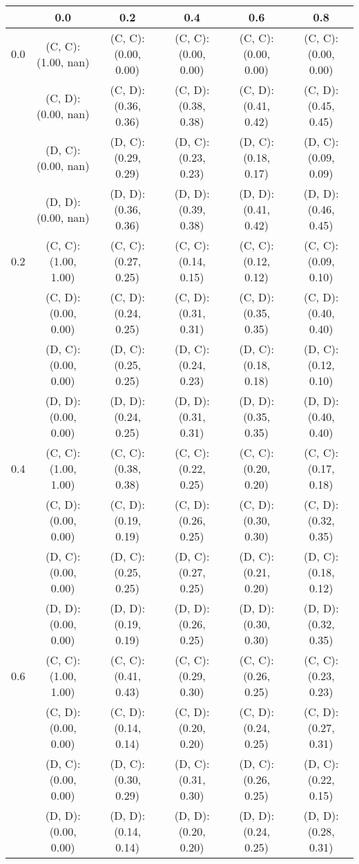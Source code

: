 \begin{tabular}{c | c c c c c}
& 0.0 & 0.2 & 0.4 & 0.6 & 0.8 \\
\hline
0.0 & (C, C): (1.00, nan) & (C, C): (0.00, 0.00) & (C, C): (0.00, 0.00) & (C, C): (0.00, 0.00) & (C, C): (0.00, 0.00) \\
 & (C, D): (0.00, nan) & (C, D): (0.36, 0.36) & (C, D): (0.38, 0.38) & (C, D): (0.41, 0.42) & (C, D): (0.45, 0.45) \\
 & (D, C): (0.00, nan) & (D, C): (0.29, 0.29) & (D, C): (0.23, 0.23) & (D, C): (0.18, 0.17) & (D, C): (0.09, 0.09) \\
 & (D, D): (0.00, nan) & (D, D): (0.36, 0.36) & (D, D): (0.39, 0.38) & (D, D): (0.41, 0.42) & (D, D): (0.46, 0.45) \\
\hline
0.2 & (C, C): (1.00, 1.00) & (C, C): (0.27, 0.25) & (C, C): (0.14, 0.15) & (C, C): (0.12, 0.12) & (C, C): (0.09, 0.10) \\
 & (C, D): (0.00, 0.00) & (C, D): (0.24, 0.25) & (C, D): (0.31, 0.31) & (C, D): (0.35, 0.35) & (C, D): (0.40, 0.40) \\
 & (D, C): (0.00, 0.00) & (D, C): (0.25, 0.25) & (D, C): (0.24, 0.23) & (D, C): (0.18, 0.18) & (D, C): (0.12, 0.10) \\
 & (D, D): (0.00, 0.00) & (D, D): (0.24, 0.25) & (D, D): (0.31, 0.31) & (D, D): (0.35, 0.35) & (D, D): (0.40, 0.40) \\
\hline
0.4 & (C, C): (1.00, 1.00) & (C, C): (0.38, 0.38) & (C, C): (0.22, 0.25) & (C, C): (0.20, 0.20) & (C, C): (0.17, 0.18) \\
 & (C, D): (0.00, 0.00) & (C, D): (0.19, 0.19) & (C, D): (0.26, 0.25) & (C, D): (0.30, 0.30) & (C, D): (0.32, 0.35) \\
 & (D, C): (0.00, 0.00) & (D, C): (0.25, 0.25) & (D, C): (0.27, 0.25) & (D, C): (0.21, 0.20) & (D, C): (0.18, 0.12) \\
 & (D, D): (0.00, 0.00) & (D, D): (0.19, 0.19) & (D, D): (0.26, 0.25) & (D, D): (0.30, 0.30) & (D, D): (0.32, 0.35) \\
\hline
0.6 & (C, C): (1.00, 1.00) & (C, C): (0.41, 0.43) & (C, C): (0.29, 0.30) & (C, C): (0.26, 0.25) & (C, C): (0.23, 0.23) \\
 & (C, D): (0.00, 0.00) & (C, D): (0.14, 0.14) & (C, D): (0.20, 0.20) & (C, D): (0.24, 0.25) & (C, D): (0.27, 0.31) \\
 & (D, C): (0.00, 0.00) & (D, C): (0.30, 0.29) & (D, C): (0.31, 0.30) & (D, C): (0.26, 0.25) & (D, C): (0.22, 0.15) \\
 & (D, D): (0.00, 0.00) & (D, D): (0.14, 0.14) & (D, D): (0.20, 0.20) & (D, D): (0.24, 0.25) & (D, D): (0.28, 0.31) \\

\end{tabular}
